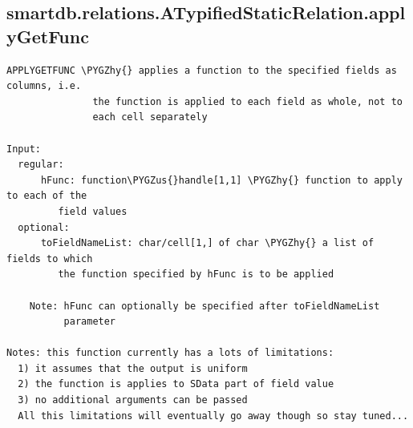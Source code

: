 \documentclass[letterpaper,10pt,english]{sphinxmanual}
\def\PYGZus{\char`\_}
\def\PYGZhy{\char`\-}
\begin{document}
\subsection{smartdb.relations.ATypifiedStaticRelation.applyGetFunc}
\label{chap_functions:smartdb-relations-atypifiedstaticrelation-applygetfunc}
\begin{Verbatim}[commandchars=\\\{\}]
APPLYGETFUNC \PYGZhy{} applies a function to the specified fields as columns, i.e.
               the function is applied to each field as whole, not to
               each cell separately

Input:
  regular:
      hFunc: function\PYGZus{}handle[1,1] \PYGZhy{} function to apply to each of the
         field values
  optional:
      toFieldNameList: char/cell[1,] of char \PYGZhy{} a list of fields to which
         the function specified by hFunc is to be applied

    Note: hFunc can optionally be specified after toFieldNameList
          parameter

Notes: this function currently has a lots of limitations:
  1) it assumes that the output is uniform
  2) the function is applies to SData part of field value
  3) no additional arguments can be passed
  All this limitations will eventually go away though so stay tuned...
\end{Verbatim}
\end{document}

